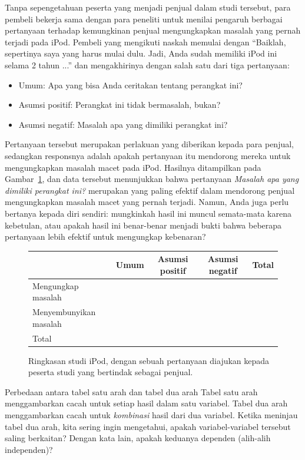 Tanpa sepengetahuan peserta yang menjadi penjual
dalam studi tersebut,
para pembeli bekerja sama dengan para peneliti
untuk menilai pengaruh berbagai pertanyaan
terhadap kemungkinan penjual mengungkapkan
masalah yang pernah terjadi pada iPod.
Pembeli yang mengikuti naskah memulai dengan
``Baiklah, sepertinya saya yang harus mulai dulu.
  Jadi, Anda sudah memiliki iPod ini selama 2 tahun ...''
dan mengakhirinya dengan salah satu dari tiga pertanyaan:
\begin{itemize}
\item Umum: Apa yang bisa Anda ceritakan tentang perangkat ini?
\item Asumsi positif: Perangkat ini tidak bermasalah, bukan?
\item Asumsi negatif: Masalah apa yang dimiliki perangkat ini?
\end{itemize}
Pertanyaan tersebut merupakan perlakuan yang diberikan kepada para penjual,
sedangkan responsnya adalah apakah pertanyaan itu mendorong mereka
untuk mengungkapkan masalah macet pada iPod.
Hasilnya ditampilkan pada Gambar~\ref{ipod_ask_data_summary},
dan data tersebut menunjukkan bahwa pertanyaan
\emph{Masalah apa yang dimiliki perangkat ini?}
merupakan yang paling efektif dalam mendorong penjual mengungkapkan
masalah macet yang pernah terjadi.
Namun, Anda juga perlu bertanya kepada diri sendiri:
mungkinkah hasil ini muncul semata-mata karena kebetulan,
atau apakah hasil ini benar-benar menjadi bukti bahwa beberapa pertanyaan
lebih efektif untuk mengungkap kebenaran?

\begin{figure}[ht]
\centering
\begin{tabular}{l ccc l}
  \hline
  & Umum & Asumsi positif &
      Asumsi negatif & Total \\ 
  \hline
  Mengungkap masalah & \iPodAA{} &  \iPodAB{} &
      \iPodAC{} & \iPodAD{} \\ 
  Menyembunyikan masalah &  \iPodBA{} &  \iPodBB{} &
      \iPodBC{} & \iPodBD{} \\ 
  \hline
  Total & \iPodDA{} & \iPodDB{} &
      \iPodDC{} & \iPodDD{} \\
  \hline
\end{tabular}
\caption{Ringkasan studi iPod, dengan sebuah pertanyaan
  diajukan kepada peserta studi yang bertindak sebagai penjual.}
\label{ipod_ask_data_summary}
\end{figure}

\begin{onebox}{Perbedaan antara tabel satu arah dan tabel dua arah}
  Tabel satu arah menggambarkan cacah untuk setiap hasil dalam satu
  variabel.
  Tabel dua arah menggambarkan cacah untuk \emph{kombinasi}
  hasil dari dua variabel.
  Ketika meninjau tabel dua arah, kita sering ingin mengetahui,
  apakah variabel-variabel tersebut saling berkaitan?
  Dengan kata lain, apakah keduanya dependen (alih-alih independen)?
\end{onebox}


